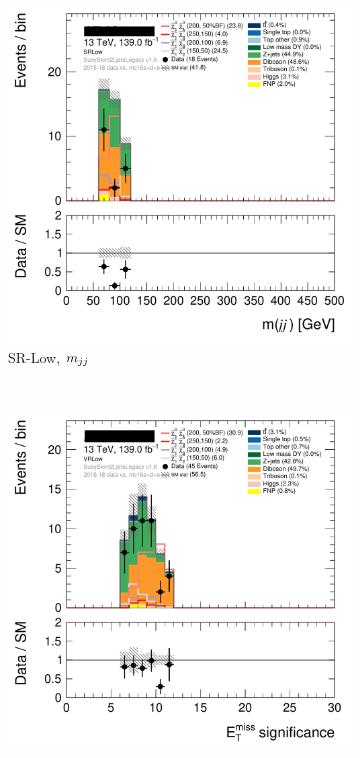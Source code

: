 \begin{figure}[tp]
\begin{subfigure}{0.495\textwidth}
\includegraphics[width=\textwidth]{figures/2ljets_def_mjj_SRLow.png}
\caption{SR-Low, $m_{jj}$}
\end{subfigure}
\\[0.5em]
\begin{subfigure}{0.495\textwidth}
\centering
\includegraphics[width=\textwidth]{figures/2ljets_def_met_Sign_VRLow.png}

\end{subfigure}
\end{figure}
